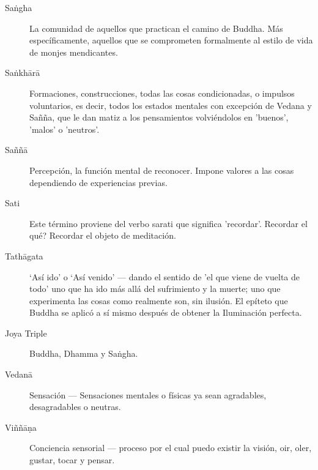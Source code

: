 \begin{description}
\item[Saṅgha] La comunidad de aquellos que practican el camino de Buddha.
  Más específicamente, aquellos que se comprometen formalmente al estilo de vida de monjes mendicantes.

\item[Saṅkhārā] Formaciones, construcciones, todas las cosas condicionadas, o impulsos voluntarios, es decir, todos los estados mentales con excepción de Vedana y Sañña, que le dan matiz a los pensamientos volviéndolos en 'buenos', 'malos' o 'neutros'.

\item[Saññā] Percepción, la función mental de reconocer. Impone valores a las cosas dependiendo de experiencias previas.

\item[Sati] Este término proviene del verbo sarati que significa 'recordar'. Recordar el qué? Recordar el objeto de meditación. 

\item[Tathāgata] ‘Así ido’ o ‘Así venido’ --- dando el sentido de 'el que viene de vuelta de todo' uno que ha ido más allá del sufrimiento y la muerte; uno que experimenta las cosas como realmente son, sin ilusión. El epíteto que Buddha se aplicó a sí mismo después de obtener la Iluminación perfecta.

\item[Joya Triple] Buddha, Dhamma y Saṅgha.

\item[Vedanā] Sensación --- Sensaciones mentales o físicas ya sean agradables, desagradables o neutras.

\item[Viññāṇa] Conciencia sensorial --- proceso por el cual puedo existir la visión, oir, oler, gustar, tocar y pensar.

\end{description}


